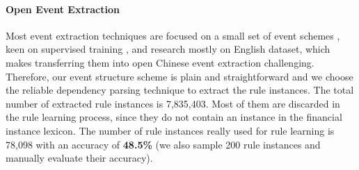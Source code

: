 


\paragraph{Open Event Extraction}
Most event extraction techniques are focused on a small set of event schemes \cite{yang2018dcfee,chen2015event}, keen on supervised training \cite{zhang2019joint,chen2015event}, and research mostly on English dataset, which makes transferring them into open Chinese event extraction challenging.
Therefore, our event structure scheme is plain and straightforward and we choose the reliable dependency parsing technique to extract the rule instances. 
The total number of extracted rule instances is 7,835,403. 
Most of them are discarded in the rule learning process, since they do not contain an instance in the financial instance lexicon.
The number of rule instances really used for rule learning is 78,098 with an accuracy of \textbf{48.5\%} (we also sample 200 rule instances and manually evaluate their accuracy).

